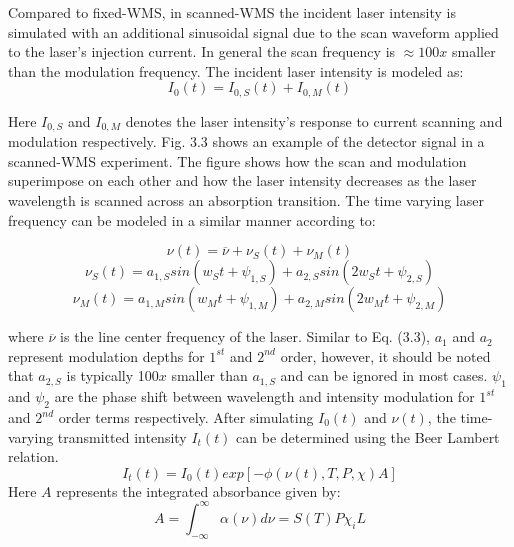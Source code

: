 Compared to fixed-WMS, in scanned-WMS the incident laser intensity is simulated with an additional sinusoidal signal due to the scan waveform applied to the laser's injection current. In general the scan frequency is $\approx100x$ smaller than the modulation frequency. The incident laser intensity is modeled as:
\begin{equation}
I_0(t)=I_{0,S}(t)+I_{0,M}(t)
\end{equation}

\noindent Here $I_{0,S}$ and $I_{0,M}$ denotes the laser intensity's response to current scanning and modulation respectively. Fig. 3.3 shows an example of the detector signal in a scanned-WMS experiment. The figure shows how the scan and modulation superimpose on each other and how the laser intensity decreases as the laser wavelength is scanned across an absorption transition. The time varying laser frequency can be modeled in a similar manner according to:


\begin{equation}
\nu(t)=\overline{\nu}+\nu_S(t)+\nu_M(t)
\end{equation}
\begin{equation}
\nu_S(t)=a_{1,S}sin(w_St+\psi_{1,S})+a_{2,S}sin(2w_St+\psi_{2,S})
\end{equation}
\begin{equation}
\nu_M(t)=a_{1,M}sin(w_Mt+\psi_{1,M})+a_{2,M}sin(2w_Mt+\psi_{2,M})
\end{equation}


\noindent where $\overline{\nu}$ is the line center frequency of the laser. Similar to Eq. (3.3), $a_1$ and $a_2$ represent modulation depths for $1^{st}$ and $2^{nd}$ order, however, it should be noted that $a_{2,S}$ is typically 100$x$ smaller than $a_{1,S}$ and can be ignored in most cases. $\psi_1$ and $\psi_2$ are the phase shift between wavelength and intensity modulation for $1^{st}$ and $2^{nd}$ order terms respectively. After simulating $I_0(t)$ and $\nu(t)$, the time-varying transmitted intensity $I_t(t)$ can be determined using the Beer Lambert relation.
\begin{equation}
I_t(t)=I_0(t)exp[-\phi(\nu(t),T,P,\chi)A]
\end{equation}
Here $A$ represents the integrated absorbance given by:
\begin{equation}
A=\int_{-\infty}^{\infty}\alpha(\nu) d\nu=S(T)P\chi_iL
\end{equation}

